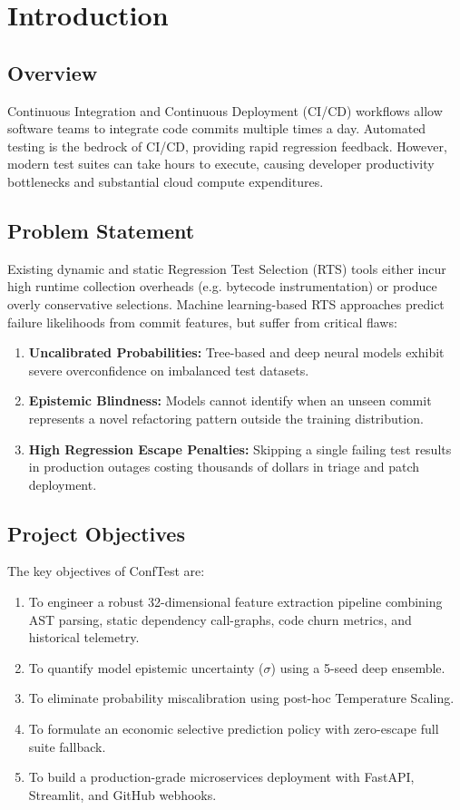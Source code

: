 \chapter{Introduction}

\section{Overview}
Continuous Integration and Continuous Deployment (CI/CD) workflows allow software teams to integrate code commits multiple times a day. Automated testing is the bedrock of CI/CD, providing rapid regression feedback. However, modern test suites can take hours to execute, causing developer productivity bottlenecks and substantial cloud compute expenditures.

\section{Problem Statement}
Existing dynamic and static Regression Test Selection (RTS) tools either incur high runtime collection overheads (e.g. bytecode instrumentation) or produce overly conservative selections. Machine learning-based RTS approaches predict failure likelihoods from commit features, but suffer from critical flaws:
\begin{enumerate}
    \item \textbf{Uncalibrated Probabilities:} Tree-based and deep neural models exhibit severe overconfidence on imbalanced test datasets.
    \item \textbf{Epistemic Blindness:} Models cannot identify when an unseen commit represents a novel refactoring pattern outside the training distribution.
    \item \textbf{High Regression Escape Penalties:} Skipping a single failing test results in production outages costing thousands of dollars in triage and patch deployment.
\end{enumerate}

\section{Project Objectives}
The key objectives of ConfTest are:
\begin{enumerate}
    \item To engineer a robust 32-dimensional feature extraction pipeline combining AST parsing, static dependency call-graphs, code churn metrics, and historical telemetry.
    \item To quantify model epistemic uncertainty ($\sigma$) using a 5-seed deep ensemble.
    \item To eliminate probability miscalibration using post-hoc Temperature Scaling.
    \item To formulate an economic selective prediction policy with zero-escape full suite fallback.
    \item To build a production-grade microservices deployment with FastAPI, Streamlit, and GitHub webhooks.
\end{enumerate}

